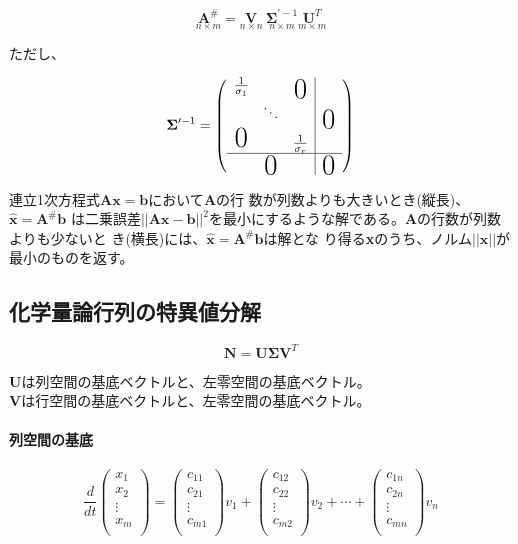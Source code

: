 \[\underset{n \times m}{\mathbf A^{\#}} = \underset{n \times n}{\mathbf V}\ \underset{n \times m}{\mathbf \Sigma^{\prime -1}} \underset{m \times m}{\mathbf U^T}\]

ただし、

\[
{\mathbf \Sigma^{\prime -1}} 
= 
\left(
\begin{array}{ccc|c}
\frac{1}{\sigma_1} & & \lower1.5ex\hbox{\text{\huge{0}}}& \\
 & \ddots & & \lower1.5ex\hbox{\text{\huge{0}}}\\
\text{\huge{0}} & & \frac{1}{\sigma_r} & \\
\hline
 & \lower1.5ex\hbox{\text{\huge{0}}}& & \lower1.5ex\hbox{\text{\huge{0}}}
\end{array}
\right)
\]

連立1次方程式\({\mathbf A}{\mathbf x}={\mathbf b}\)において{\bf A}の行
数が列数よりも大きいとき(縦長)、\(\hat{\mathbf x} = {\mathbf
  A}^{\#}{\mathbf b}\) は二乗誤差\(||{\mathbf A}{\mathbf x} - {\mathbf
  b}||^2\)を最小にするような解である。{\bf A}の行数が列数よりも少ないと
き(横長)には、\(\hat{\mathbf x} = {\mathbf A}^{\#}{\mathbf b}\)は解とな
り得る{\bf x}のうち、ノルム\(||{\mathbf x}||\)が最小のものを返す。
\subsection{化学量論行列の特異値分解}

\[{\mathbf N} = {\mathbf U}{\mathbf \Sigma}{\mathbf V^T}\]

{\bf U}は列空間の基底ベクトルと、左零空間の基底ベクトル。\\
{\bf V}は行空間の基底ベクトルと、左零空間の基底ベクトル。\\

\paragraph{列空間の基底}
\[
\frac{d}{dt}
\left(
\begin{array}{c}
x_1\\
x_2\\
\vdots\\
x_m\\
\end{array}
\right)
=
\left(
\begin{array}{c}
c_{11}\\
c_{21}\\
\vdots\\
c_{m1}\\
\end{array}
\right)
v_1
+
\left(
\begin{array}{c}
c_{12}\\
c_{22}\\
\vdots\\
c_{m2}\\
\end{array}
\right)
v_2
+
\cdots
+
\left(
\begin{array}{c}
c_{1n}\\
c_{2n}\\
\vdots\\
c_{mn}\\
\end{array}
\right)
v_n
\]

